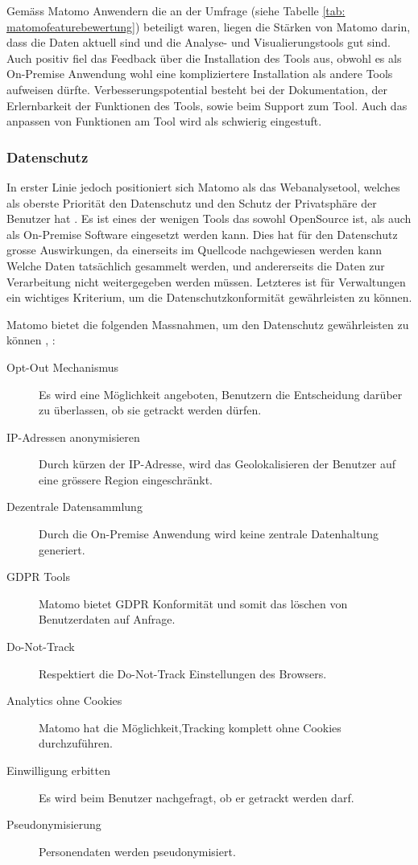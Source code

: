 Gemäss Matomo Anwendern die an der Umfrage (siehe Tabelle \ref{tab: matomofeaturebewertung}) beteiligt waren, liegen die Stärken von Matomo darin, dass die Daten aktuell sind und die Analyse- und Visualierungstools gut sind. 
Auch positiv fiel das Feedback über die Installation des Tools aus, obwohl es als On-Premise Anwendung wohl eine kompliziertere Installation als andere Tools aufweisen dürfte.
Verbesserungspotential besteht bei der Dokumentation, der Erlernbarkeit der Funktionen des Tools, sowie beim Support zum Tool. Auch das anpassen von Funktionen am Tool wird als schwierig eingestuft.

\subsubsection{Datenschutz}
In erster Linie jedoch positioniert sich Matomo als das Webanalysetool, welches als oberste Priorität den Datenschutz und den Schutz der Privatsphäre der Benutzer hat \parencite{MamotoPrivacy}. Es ist eines der wenigen Tools das sowohl OpenSource ist, als auch als On-Premise Software eingesetzt werden kann. Dies hat für den Datenschutz grosse Auswirkungen, da einerseits im Quellcode nachgewiesen werden kann Welche Daten tatsächlich gesammelt werden, und andererseits die Daten zur Verarbeitung nicht weitergegeben werden müssen. Letzteres ist für Verwaltungen ein wichtiges Kriterium, um die Datenschutzkonformität gewährleisten zu können.

Matomo bietet die folgenden Massnahmen, um den Datenschutz gewährleisten zu können \parencite{MamotoFeatures}, \parencite{MamotoPrivacy}:

\begin{description}
  \item[Opt-Out Mechanismus] Es wird eine Möglichkeit angeboten, Benutzern die Entscheidung darüber zu überlassen, ob sie getrackt werden dürfen.
  \item[IP-Adressen anonymisieren] Durch kürzen der IP-Adresse, wird das Geolokalisieren der Benutzer auf eine grössere Region eingeschränkt.
  \item[Dezentrale Datensammlung] Durch die On-Premise  Anwendung wird keine zentrale Datenhaltung generiert.
  \item[GDPR Tools] Matomo bietet GDPR Konformität und somit das löschen von Benutzerdaten auf Anfrage.  
  \item[Do-Not-Track] Respektiert die Do-Not-Track Einstellungen des Browsers.
  \item[Analytics ohne Cookies] Matomo hat die Möglichkeit,Tracking komplett ohne Cookies durchzuführen.
  \item[Einwilligung erbitten] Es wird beim Benutzer nachgefragt, ob er getrackt werden darf.
  \item[Pseudonymisierung] Personendaten werden pseudonymisiert.  
\end{description}

